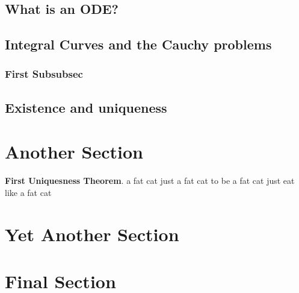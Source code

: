 \documentclass[twoside,a4paper,12pt]{article} %
\begin{document}
\subsection{What is an ODE?}



\subsection{Integral Curves and the Cauchy problems}
\subsubsection{First Subsubsec}


\subsection{Existence and uniqueness}

\section{Another Section}
\lipsum[1]
\begin{center}
	\parbox{0.8\textwidth}{
	\textbf{First Uniquesness Theorem}. a fat cat just a fat cat to be a fat cat just eat like a fat cat
	}
\end{center}
\section{Yet Another Section}
\section{Final Section}

\newpage

\lipsum[1]
\end{document}
